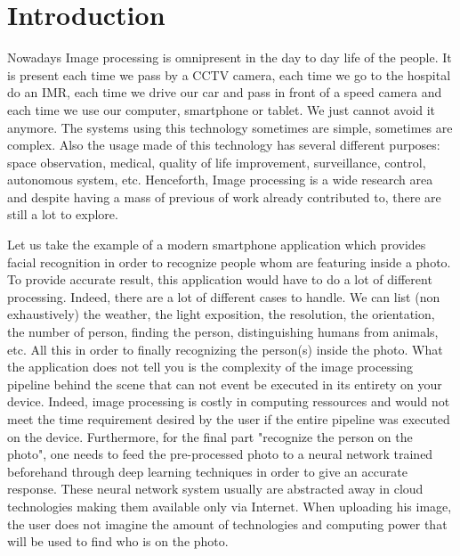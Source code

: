 \chapter*{Introduction}
\label{introduction.chap.introduction}

Nowadays Image processing is omnipresent in the day to day life of the people. It is present each time we pass by a
CCTV camera, each time we go to the hospital do an IMR, each time we drive our car and pass in front of a speed camera
and each time we use our computer, smartphone or tablet. We just cannot avoid it anymore. The systems using this
technology sometimes are simple, sometimes are complex. Also the usage made of this technology has several different
purposes: space observation, medical, quality of life improvement, surveillance, control, autonomous system, etc.
Henceforth, Image processing is a wide research area and despite having a mass of previous of work already contributed
to, there are still a lot to explore.

Let us take the example of a modern smartphone application which provides facial recognition in order to recognize
people whom are featuring inside a photo. To provide accurate result, this application would have to do a lot of
different processing. Indeed, there are a lot of different cases to handle. We can list (non exhaustively) the weather,
the light exposition, the resolution, the orientation, the number of person, finding the person, distinguishing humans
from animals, etc. All this in order to finally recognizing the person(s) inside the photo. What the application does
not tell you is the complexity of the image processing pipeline behind the scene that can not event be executed in its
entirety on your device. Indeed, image processing is costly in computing ressources and would not meet the time
requirement desired by the user if the entire pipeline was executed on the device. Furthermore, for the final part
"recognize the person on the photo", one needs to feed the pre-processed photo to a neural network trained beforehand
through deep learning techniques in order to give an accurate response. These neural network system usually are
abstracted away in cloud technologies making them available only via Internet. When uploading his image, the user does
not imagine the amount of technologies and computing power that will be used to find who is on the photo.

